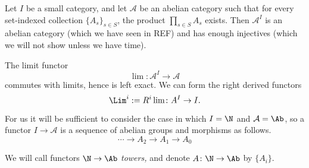 \documentclass[main.tex]{subfiles}
\begin{document}
Let $I$ be a small category, and let $\mathcal{A}$ be an abelian category such that for every set-indexed collection $\{A_{s}\}_{s \in S}$, the product $\prod_{s \in S} A_{s}$ exists. Then $\mathcal{A}^{I}$ is an abelian category (which we have seen in REF) and has enough injectives (which we will not show unless we have time).

The limit functor
\begin{equation*}
  \lim\colon \mathcal{A}^{I} \to \mathcal{A}
\end{equation*}
commutes with limits, hence is left exact. We can form the right derived functors
\begin{equation*}
  \Lim^{i} := R^{i} \lim \colon A^{I} \to I.
\end{equation*}

For us it will be sufficient to consider the case in which $I = \N$ and $\mathcal{A} = \Ab$, so a functor $I \to \mathcal{A}$ is a sequence of abelian groups and morphisms as follows.
\begin{equation*}
  \cdots \to A_{2} \to A_{1} \to A_{0}
\end{equation*}

We will call functors $\N \to \Ab$ \emph{towers,} and denote \(A\colon \N \to \Ab\) by \(\{A_{i}\}\).
\end{document}
